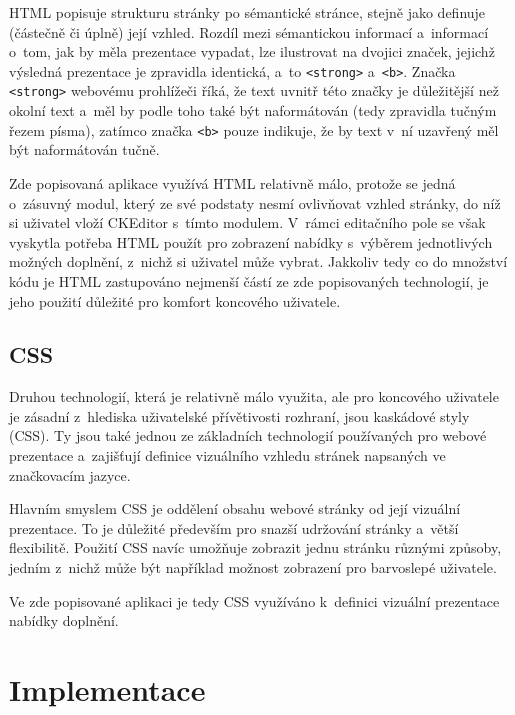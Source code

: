 \documentclass[a4paper,11pt,openany]{book} %
\begin{document}
HTML popisuje strukturu stránky po sémantické stránce, stejně jako definuje (částečně či úplně) její vzhled. Rozdíl mezi sémantickou informací a~informací o~tom, jak by měla prezentace vypadat, lze ilustrovat na dvojici značek, jejichž výsledná prezentace je zpravidla identická, a~to {\tt <strong>} a~{\tt <b>}. Značka {\tt <strong>} webovému prohlížeči říká, že text uvnitř této značky je důležitější než okolní text a~měl by podle toho také být naformátován (tedy zpravidla tučným řezem písma), zatímco značka {\tt <b>} pouze indikuje, že by text v~ní uzavřený měl být naformátován tučně. %


Zde popisovaná aplikace využívá HTML relativně málo, protože se jedná o~zásuvný modul, který ze své podstaty nesmí ovlivňovat vzhled stránky, do níž si uživatel vloží CKEditor s~tímto modulem. V~rámci editačního pole se však vyskytla potřeba HTML použít pro zobrazení nabídky s~výběrem jednotlivých možných doplnění, z~nichž si uživatel může vybrat. Jakkoliv tedy co do množství kódu je HTML zastupováno nejmenší částí ze zde popisovaných technologií, je jeho použití důležité pro komfort koncového uživatele.

\section{CSS}

Druhou technologií, která je relativně málo využita, ale pro koncového uživatele je zásadní z~hlediska uživatelské přívětivosti rozhraní, jsou kaskádové styly (CSS). Ty jsou také jednou ze základních technologií používaných pro webové prezentace a~zajišťují definice vizuálního vzhledu stránek napsaných ve značkovacím jazyce. \parencite{meyer2004cascading}

Hlavním smyslem CSS je oddělení obsahu webové stránky od její vizuální prezentace. To je důležité především pro snazší udržování stránky a~větší flexibilitě. Použití CSS navíc umožňuje zobrazit jednu stránku různými způsoby, jedním z~nichž může být například možnost zobrazení pro barvoslepé uživatele.

Ve zde popisované aplikaci je tedy CSS využíváno k~definici vizuální prezentace nabídky doplnění.

\chapter{Implementace}
\end{document}
